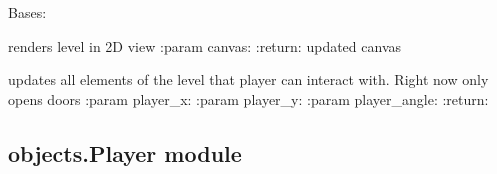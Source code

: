 \documentclass[letterpaper,10pt,english]{sphinxmanual}
\begin{document}
\begin{fulllineitems}
\label{\detokenize{objects:objects.Level.Level}}
\pysigstartsignatures
{}
\pysigstopsignatures
\sphinxAtStartPar
Bases: 

\begin{fulllineitems}
\label{\detokenize{objects:objects.Level.Level.render}}
\pysigstartsignatures
{}
\pysigstopsignatures
\sphinxAtStartPar
renders level in 2D view
:param canvas:
:return: updated canvas

\end{fulllineitems}


\begin{fulllineitems}
\label{\detokenize{objects:objects.Level.Level.update}}
\pysigstartsignatures
{}
\pysigstopsignatures
\sphinxAtStartPar
updates all elements of the level that player can interact with. Right now only opens doors
:param player\_x:
:param player\_y:
:param player\_angle:
:return:

\end{fulllineitems}


\end{fulllineitems}



\subsection{objects.Player module}
\label{\detokenize{objects:module-objects.Player}}\label{\detokenize{objects:objects-player-module}}
\end{document}
